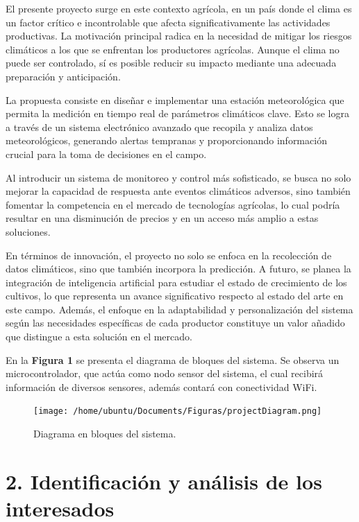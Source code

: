\documentclass[
11pt, %
codirector, %
]{charter}
\begin{document}
El presente proyecto surge en este contexto agrícola, en un país donde el clima es un factor crítico e incontrolable que afecta significativamente las actividades productivas. La motivación principal radica en la necesidad de mitigar los riesgos climáticos a los que se enfrentan los productores agrícolas. Aunque el clima no puede ser controlado, sí es posible reducir su impacto mediante una adecuada preparación y anticipación.

La propuesta consiste en diseñar e implementar una estación meteorológica que permita la medición en tiempo real de parámetros climáticos clave. Esto se logra a través de un sistema electrónico avanzado que recopila y analiza datos meteorológicos, generando alertas tempranas y proporcionando información crucial para la toma de decisiones en el campo.

Al introducir un sistema de monitoreo y control más sofisticado, se busca no solo mejorar la capacidad de respuesta ante eventos climáticos adversos, sino también fomentar la competencia en el mercado de tecnologías agrícolas, lo cual podría resultar en una disminución de precios y en un acceso más amplio a estas soluciones.

En términos de innovación, el proyecto no solo se enfoca en la recolección de datos climáticos, sino que también incorpora la predicción. A futuro, se planea la integración de inteligencia artificial para estudiar el estado de crecimiento de los cultivos, lo que representa un avance significativo respecto al estado del arte en este campo. Además, el enfoque en la adaptabilidad y personalización del sistema según las necesidades específicas de cada productor constituye un valor añadido que distingue a esta solución en el mercado.

En la \textbf{Figura 1} se presenta el diagrama de bloques del sistema. Se observa un microcontrolador, que actúa como nodo sensor del sistema, el cual recibirá información de diversos sensores, además contará con conectividad WiFi.

\begin{figure}[htpb]
\centering 
\texttt{[image: /home/ubuntu/Documents/Figuras/projectDiagram.png]}
\caption{Diagrama en bloques del sistema.}
\label{fig:diagBloques}
\end{figure}

\vspace{25px}

\newpage

\section{2. Identificación y análisis de los interesados}
\label{sec:interesados}
\end{document}
